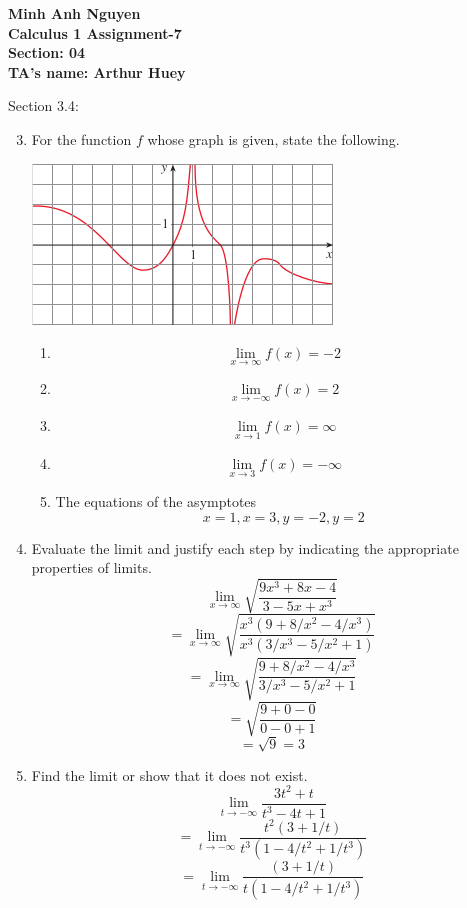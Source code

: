 \documentclass[12pt]{article}
\begin{document}
\textbf{Minh Anh Nguyen }\\
\textbf{Calculus 1 Assignment-7}\\
\textbf{Section: 04}\\
\textbf{TA's name: Arthur Huey}

\hrulefill

Section 3.4:

\begin{enumerate}
    \setcounter{enumi}{2}
    \item For the function $f$ whose graph is given, state the following.
    \begin{center}
        \includegraphics{img/img-0.png}
    \end{center}
    \begin{enumerate}
        \item \[\boxed{\lim_{x \to \infty } f(x) = -2}\]
        \item \[\boxed{\lim_{x \to -\infty} f(x) = 2}\]
        \item \[\boxed{\lim_{x \to 1} f(x) = \infty}\]
        \item \[\boxed{\lim_{x \to 3} f(x) = -\infty}\]
        \item The equations of the asymptotes
        \[\boxed{x = 1, x = 3, y = -2, y = 2}\]
    \end{enumerate}
    \setcounter{enumi}{7}
    \item Evaluate the limit and justify each step by indicating the appropriate properties of limits.
    \[\lim_{x \to \infty} \sqrt{\frac{9x^3+8x-4}{3-5x+x^3}}\]
    \[= \lim_{x \to \infty} \sqrt{\frac{x^3(9+8/x^2-4/x^3)}{x^3(3/x^3-5/x^2+1)}}\]
    \[= \lim_{x \to \infty} \sqrt{\frac{9+8/x^2-4/x^3}{3/x^3-5/x^2+1}}\]
    \[= \sqrt{\frac{9+0-0}{0-0+1}}\]
    \[\boxed{= \sqrt{9} = 3}\]
    \setcounter{enumi}{10}
    \item Find the limit or show that it does not exist.
    \[\lim_{t \to -\infty} \frac{3t^2 + t}{t^3 -4t + 1}\]
    \[= \lim_{t \to -\infty} \frac{t^2(3 + 1/t)}{t^3(1 -4/t^2 + 1/t^3)}\]
    \[= \lim_{t \to -\infty} \frac{(3 + 1/t)}{t(1 -4/t^2 + 1/t^3)}\]

\end{enumerate}
\end{document}
